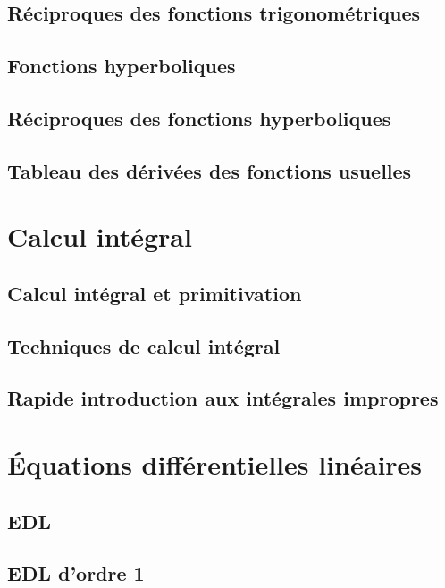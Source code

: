 \documentclass[11pt,twoside,a4paper]{article}
\begin{document}
\subsection{Réciproques des fonctions trigonométriques}

\subsection{Fonctions hyperboliques}

\subsection{Réciproques des fonctions hyperboliques}

\subsection{Tableau des dérivées des fonctions usuelles}

\newpage
\section{Calcul intégral}

\subsection{Calcul intégral et primitivation}

\subsection{Techniques de calcul intégral}

\subsection{Rapide introduction aux intégrales impropres}

\newpage
\section{Équations différentielles linéaires}

\subsection{EDL}

\subsection{EDL d'ordre 1}
\end{document}
